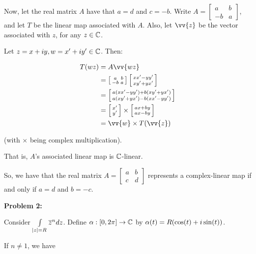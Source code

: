 \documentclass[a4paper,12pt]{article}
\begin{document}
Now, let the real matrix $A$ have that $a=d$ and $c=-b$. Write $A=\left[\begin{smallmatrix}a&b\\ -b&a \end{smallmatrix}\right]$, and let $T$ be the linear map associated with $A$. Also, let $\vv{z}$ be the vector associated with $z$, for any $z \in \mathbb{C}$.

Let $z=x+iy, w=x'+iy' \in \mathbb{C}$. Then:

\begin{align*}
T(wz) &= A\vv{wz} \\
&=\left[\begin{smallmatrix}a&b\\ -b&a \end{smallmatrix}\right]\left[\begin{smallmatrix}xx'-yy'\\ xy'+yx' \end{smallmatrix}\right]\\
&=\left[\begin{smallmatrix}a(xx'-yy')+b(xy'+yx')\\ a(xy'+yx')-b(xx'-yy') \end{smallmatrix}\right]\\
&=\left[\begin{smallmatrix}x'\\y' \end{smallmatrix}\right] \times \left[\begin{smallmatrix}ax+by\\ ax-by \end{smallmatrix}\right]\\
&= \vv{w} \times T(\vv{z})
\end{align*}

(with $\times$ being complex multiplication).

That is, $A$'s associated linear map is $\mathbb{C}$-linear.

So, we have that the real matrix $A= \left[\begin{smallmatrix}a&b\\ c&d \end{smallmatrix}\right]$ represents a complex-linear map if and only if $a=d$ and $b=-c$.

\shunt

{\bf Problem 2:}

Consider $\int\limits_{\left\lvert z \right\rvert = R} \overline{z}^n dz$. Define $\alpha: [0,2\pi] \to \mathbb{C}$ by $\alpha(t) = R(\cos(t)+i\sin(t))$.

If $n \neq 1$, we have
\end{document}
